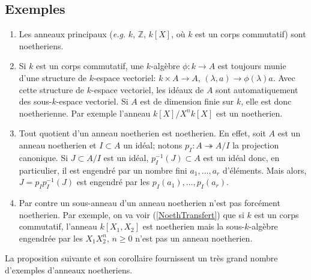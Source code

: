 \documentclass[a4paper, 12pt]{amsart}
\newcommand{\Z}{\mathbb{Z}}
\begin{document}
    \subsection{Exemples}\label{NoethEx}
      \begin{enumerate}[leftmargin=* ,parsep=0cm,itemsep=0cm,topsep=0cm]
     \item  Les anneaux principaux (\textit{e.g.} $k$, $\Z$, $k[X]$, o\`u $k$ est un corps commutatif) sont noetheriens. 
     \item  Si $k$ est un corps commutatif, une  $k$-algèbre $\phi:k\rightarrow A$ est toujours munie d'une structure de $k$-espace vectoriel: $k\times A\rightarrow A$, $(\lambda,a)\rightarrow \phi(\lambda)a$. Avec cette structure de $k$-espace vectoriel, les idéaux de $A$ sont automatiquement des sous-$k$-espace vectoriel. Si $A$ est de dimension finie sur $k$, elle est donc noetherienne. Par exemple l'anneau $k[X]/X^nk[X]$ est un  noetherien. 
     \item  Tout quotient d'un anneau noetherien est noetherien. En effet, soit $A$ est un anneau noetherien et $I\subset A$  un idéal; notons $p_I:A\twoheadrightarrow A/I$ la projection canonique. Si $J\subset A/I$ est un idéal, $p_I^{-1}(J)\subset A$ est un idéal donc, en particulier, il est engendré par un nombre fini $a_1,\dots, a_r$ d'éléments. Mais alors, $J=p_Ip_I^{-1}(J)$ est engendré par les  $p_I(a_1),\dots, p_I(a_r)$.
     \item Par contre un sous-anneau d'un anneau noetherien n'est pas forcément noetherien. Par exemple, on va voir (\ref{NoethTransfert}) que si $k$ est un corps commutatif, l'anneau $k[X_1,X_2]$ est noetherien mais la sous-$k$-algèbre engendrée par les $  X_1X_2^n$, $n\geq 0$ n'est pas un anneau noetherien.\\
\end{enumerate}
    
 La proposition suivante et son corollaire fournissent un très grand nombre d'exemples d'anneaux noetheriens.   
    
\end{document}
